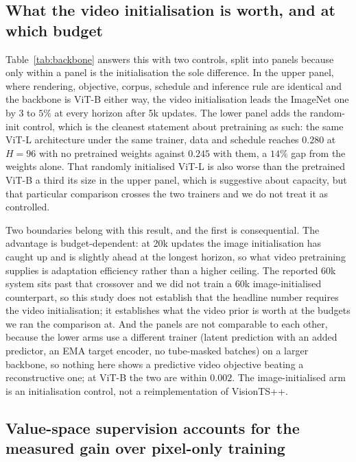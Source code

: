 \subsection{What the video initialisation is worth, and at which budget}
\label{sec:backbone}



Table~\ref{tab:backbone} answers this with two controls, split into panels because only within a
panel is the initialisation the sole difference. In the upper panel, where rendering, objective,
corpus, schedule and inference rule are identical and the backbone is ViT-B either way, the video
initialisation leads the ImageNet
one by $3$ to $5\%$ at every horizon after 5k updates. The lower panel adds the random-init control, which is
the cleanest statement about pretraining as such: the same ViT-L architecture under the same trainer,
data and schedule reaches $0.280$ at $H{=}96$ with no pretrained weights against $0.245$ with them,
a $14\%$ gap from the weights alone. That randomly initialised ViT-L is also worse than the
pretrained ViT-B a third its size in the upper panel, which is suggestive about capacity, but that
particular comparison crosses the two trainers and we do not treat it as controlled.

Two boundaries belong with this result, and the first is consequential. The advantage is
budget-dependent: at 20k updates the image initialisation has caught up and is slightly ahead at the
longest horizon, so what video pretraining supplies is adaptation efficiency rather than a higher
ceiling. The reported 60k system sits past that crossover and we did not train a 60k image-initialised
counterpart, so this study does not establish that the headline number requires the video
initialisation; it establishes what the video prior is worth at the budgets we ran the comparison
at. And the panels are not comparable to
each other, because the lower arms use a different trainer (latent prediction with an added
predictor, an EMA target encoder, no tube-masked batches) on a larger backbone, so nothing here
shows a
predictive video objective beating a reconstructive one; at ViT-B the two are within $0.002$. The
image-initialised arm is an initialisation control, not a reimplementation of VisionTS++.

\subsection{Value-space supervision accounts for the measured gain over pixel-only training}
\label{sec:design}

